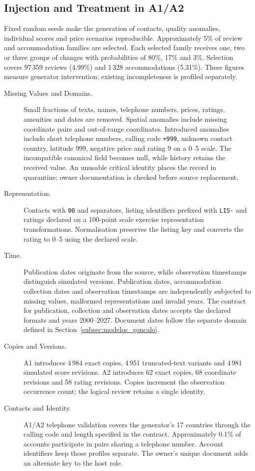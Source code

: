 \subsection{Injection and Treatment in A1/A2}\label{subsec:qualidade_goncalo}
Fixed random seeds make the generation of contacts, quality anomalies, individual scores and price scenarios reproducible. Approximately 5\% of review and accommodation families are selected. Each selected family receives one, two or three groups of changes with probabilities of 80\%, 17\% and 3\%. Selection covers 97\,359 reviews (4.99\%) and 1\,328 accommodations (5.31\%). These figures measure generator intervention; existing incompleteness is profiled separately.
\begin{description}
\item[Missing Values and Domains.] Small fractions of texts, names, telephone numbers, prices, ratings, amenities and dates are removed. Spatial anomalies include missing coordinate pairs and out-of-range coordinates. Introduced anomalies include short telephone numbers, calling code \texttt{+999}, unknown contact country, latitude 999, negative price and rating 9 on a 0--5 scale. The incompatible canonical field becomes null, while history retains the received value. An unusable critical identity places the record in quarantine; owner documentation is checked before source replacement.
\item[Representation.] Contacts with \texttt{00} and separators, listing identifiers prefixed with \texttt{LIS-} and ratings declared on a 100-point scale exercise representation transformations. Normalisation preserves the listing key and converts the rating to 0--5 using the declared scale.
\item[Time.] Publication dates originate from the source, while observation timestamps distinguish simulated versions. Publication dates, accommodation collection dates and observation timestamps are independently subjected to missing values, malformed representations and invalid years. The contract for publication, collection and observation dates accepts the declared formats and years 2000--2027. Document dates follow the separate domain defined in Section~\ref{subsec:modelos_goncalo}.
\item[Copies and Versions.] A1 introduces 4\,984 exact copies, 4\,951 truncated-text variants and 4\,981 simulated score revisions. A2 introduces 62 exact copies, 68 coordinate revisions and 58 rating revisions. Copies increment the observation occurrence count; the logical review retains a single identity.
\item[Contacts and Identity.] A1/A2 telephone validation covers the generator's 17 countries through the calling code and length specified in the contract. Approximately 0.1\% of accounts participate in pairs sharing a telephone number. Account identifiers keep those profiles separate. The owner's unique document adds an alternate key to the host role.
\end{description}
